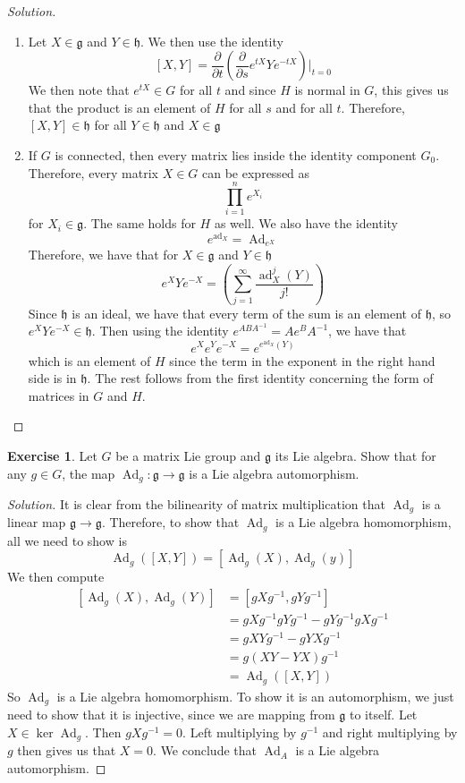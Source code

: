 \documentclass[psamsfonts]{amsart}
\theoremstyle{definition}
\newtheorem{exer}[thm]{Exercise}
\theoremstyle{remark}
\newcommand{\g}{\mathfrak{g}}
\newcommand{\inv}{^{-1}}
\newcommand{\bra}[2]{ \left[ #1, #2 \right] }
\newcommand{\bd}{\partial}
\DeclareMathOperator{\ad}{ad}
\DeclareMathOperator{\Ad}{Ad}
\begin{document}
\begin{proof}[Solution]\ \\ \vspace{-\baselineskip}
\begin{enumerate}
\item Let $X \in \g$ and $Y \in \mathfrak{h}$. We then use the identity
$$\bra{X}{Y} = \frac{\bd}{\bd t}\left( \frac{\bd}{\bd s} e^{tX}Ye^{-tX}\right)\bigg\vert_{t = 0} $$
We then note that $e^{tX} \in G$ for all $t$ and since $H$ is normal in $G$, this gives us that the product is an element of $H$ for all $s$ and for all $t$. Therefore, $\bra{X}{Y} \in \mathfrak{h}$ for all $Y \in \mathfrak{h}$ and $X \in \mathfrak{g}$
\item If $G$ is connected, then every matrix lies inside the identity component $G_0$. Therefore, every matrix $X \in G$ can be expressed as 
$$\prod_{i = 1}^n e^{X_i}$$
for $X_i \in \g$.  The same holds for $H$ as well. We also have the identity
$$e^{\ad_X} = \Ad_{e^X} $$
Therefore, we have that for $X \in \g$ and $Y \in \mathfrak{h}$
$$e^X Y e^{-X} = \left(\sum_{j = 1}^\infty \frac{\ad_X^j(Y)}{j!}  \right) $$
Since $\mathfrak{h}$ is an ideal, we have that every term of the sum is an element of $\mathfrak{h}$, so $e^XYe^{-X} \in \mathfrak{h}$. Then using the identity $e^{ABA\inv} = Ae^BA\inv$, we have that 
$$e^Xe^Ye^{-X} = e^{e^{\ad_X}(Y)} $$
which is an element of $H$ since the term in the exponent in the right hand side is in $\mathfrak{h}$. The rest follows from the first identity concerning the form of matrices in $G$ and $H$.
\end{enumerate}
\end{proof}

\setcounter{thm}{12}

\begin{exer}
Let $G$ be a matrix Lie group and $\g$ its Lie algebra. Show that for any $g \in G$, the map $\Ad_g: \g \to \g$ is a Lie algebra automorphism.
\end{exer}

\begin{proof}[Solution]
It is clear from the bilinearity of matrix multiplication that $\Ad_g$ is a linear map $\g \to \g$. Therefore, to show that $\Ad_g$ is a Lie algebra homomorphism, all we need to show is 
$$\Ad_g(\bra{X}{Y}) = \bra{\Ad_g(X)}{\Ad_g(y)}$$
We then compute
\begin{align*}
\bra{\Ad_g(X)}{\Ad_g(Y)} &= \bra{gXg\inv}{gYg\inv} \\
&= gXg\inv gYg\inv - gYg\inv gXg\inv \\
&= gXYg\inv - gYXg\inv \\
&= g(XY - YX) g\inv \\
&= \Ad_g(\bra{X}{Y})
\end{align*}
So $\Ad_g$ is a Lie algebra homomorphism. To show it is an automorphism, we just need to show that it is injective, since we are mapping from $\g$ to itself. Let $X \in \ker \Ad_g$. Then $gXg\inv = 0$. Left multiplying by $g\inv$ and right multiplying by $g$ then gives us that $X = 0$. We conclude that $\Ad_A$ is a Lie algebra automorphism.
\end{proof}
\end{document}
